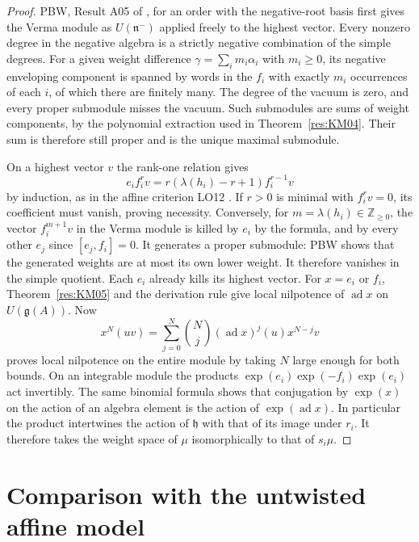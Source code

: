 \begin{proof}
PBW, Result A05 of \cite[PDF pp.~8--9]{mg-lie}, for an order
with the negative-root basis first gives the
Verma module as \(U(\mathfrak n^-)\) applied freely to the
highest vector. Every nonzero degree in the negative algebra
is a strictly negative combination of the simple degrees.
For a given weight difference \(\gamma=\sum_i m_i\alpha_i\)
with \(m_i\ge0\), its negative enveloping component is spanned
by words in the \(f_i\) with exactly \(m_i\) occurrences of
each \(i\), of which there are finitely many.
The degree of the vacuum is zero, and every proper submodule
misses the vacuum. Such submodules are sums of weight components,
by the polynomial extraction used in Theorem~\ref{res:KM04}.
Their sum is therefore still proper and is the unique maximal
submodule.

On a highest vector \(v\) the rank-one relation gives
\[
 e_i f_i^r v
   =r(\lambda(h_i)-r+1)f_i^{r-1}v
\]
by induction, as in the affine criterion LO12
\cite[PDF p.~27]{mg-reptopics}. If \(r>0\) is minimal with
\(f_i^r v=0\), its coefficient must vanish, proving necessity.
Conversely, for \(m=\lambda(h_i)\in\mathbb Z_{\ge0}\),
the vector \(f_i^{m+1}v\) in the Verma module is killed by \(e_i\)
by the formula, and by every other \(e_j\) since \([e_j,f_i]=0\).
It generates a proper submodule: PBW shows that the generated
weights are at most its own lower weight. It therefore vanishes
in the simple quotient. Each \(e_i\) already kills its highest
vector. For \(x=e_i\) or \(f_i\), Theorem~\ref{res:KM05} and the
derivation rule give local nilpotence of \(\operatorname{ad}x\)
on \(U(\mathfrak g(A))\). Now
\[
 x^N(uv)=\sum_{j=0}^N\binom Nj
       (\operatorname{ad}x)^j(u)x^{N-j}v
\]
proves local nilpotence on the entire module by taking \(N\)
large enough for both bounds. On an integrable module the
products \(\exp(e_i)\exp(-f_i)\exp(e_i)\) act invertibly.
The same binomial formula shows that conjugation by
\(\exp(x)\) on the action of an algebra element is
the action of \(\exp(\operatorname{ad}x)\). In particular the
product intertwines the action of \(\mathfrak h\) with that
of its image under \(r_i\). It therefore takes the weight
space of \(\mu\) isomorphically to that of \(s_i\mu\).
\end{proof}

\section{Comparison with the untwisted affine model}

